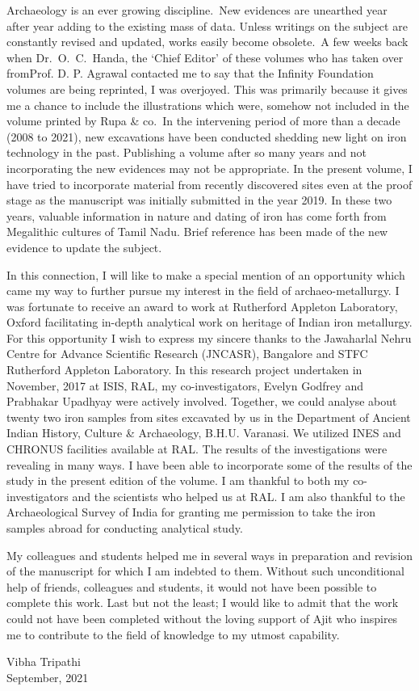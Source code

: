 Archaeology is an ever growing discipline.~New evidences are unearthed year after year adding to the existing mass of data. Unless writings on the subject are constantly revised and updated, works easily become obsolete.~A few weeks back when Dr.~O.~C.~Handa, the  ‘Chief Editor’ of these volumes who has taken over from\break Prof. D. P. Agrawal contacted me to say that the Infinity Foundation volumes are being reprinted, I was overjoyed. This was primarily because it gives me a chance to include the illustrations which were, somehow not included in the volume printed by Rupa \& co.~In the intervening period of more than a decade (2008 to 2021), new excavations have been conducted shedding new light on iron technology in the past. Publishing a volume after so many years and not incorporating the new evidences may not be appropriate. In the present volume, I have tried to incorporate material from recently discovered sites even at the proof stage as the manuscript was initially submitted in the year 2019. In these two years, valuable information in nature and dating of iron has come forth from Megalithic cultures of Tamil Nadu. Brief reference has been made of the new evidence to update the subject.

In this connection, I will like to make a special mention of an opportunity which came my way to further pursue my interest in the field of archaeo-metallurgy. I was fortunate to receive an award to work at Rutherford Appleton Laboratory, Oxford facilitating in-depth analytical work on heritage of Indian iron metallurgy. For this opportunity I wish to express my sincere thanks to the Jawaharlal Nehru Centre for Advance Scientific Research   (JNCASR), Bangalore and   STFC Rutherford Appleton Laboratory.  In this research project undertaken in November, 2017 at ISIS, RAL, my co-investigators, Evelyn Godfrey and Prabhakar Upadhyay were actively involved. Together, we could analyse about twenty two iron samples from sites excavated by us in the Department of Ancient Indian History, Culture \& Archaeology, B.H.U. Varanasi. We utilized INES and CHRONUS facilities available at RAL. The results of the investigations were revealing in many ways. I have been able to incorporate some of the results of the study in the present edition of the volume. I am thankful to both my co-investigators and the scientists who helped us at RAL. I am also thankful to the Archaeological Survey of India for granting me permission to take the iron samples abroad for conducting analytical study. 

My colleagues and students helped me in several ways in preparation and revision of the manuscript for which I am indebted to them. Without such unconditional help of friends, colleagues and students, it would not have been possible to complete this work. Last but not the least; I would like to admit that the work could not have been completed without the loving support of Ajit who inspires me to contribute to the field of knowledge to my utmost capability. 

Vibha Tripathi\\ September, 2021
